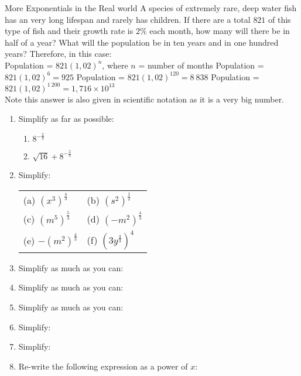 \begin{wex}{More Exponentials in the Real world} 
{A species of extremely rare, deep water fish has an very long lifespan and rarely has children. If there are a total $821$ of this type of fish and their growth rate is $2\%$ each month, how many will there be in half of a year? What will the population be in ten years and in one hundred years?}{
Therefore, in this case:\\
Population = $821(1,02)^n$,   where $n$ = number of months
Population = $821(1,02)^6 = 925$
Population = $821(1,02)^{120} = 8~838$
Population = $821(1,02)^{1~200} = 1,716 \times 10^{13}$\\
Note this answer is also given in scientific notation as it is a very big number.}
\end{wex}

\begin{eocexercises}{}
\begin{enumerate}
\item{Simplify as far as possible:
\begin{enumerate}
\item{$8^{-\frac{2}{3}}$}
\item{$\sqrt{16}+8^{-\frac{2}{3}}$}
\end{enumerate}}
\item{Simplify:
\begin{center}
\begin{tabular}{p{4cm}p{4cm}}
(a) $(x^3)^\frac{4}{3}$ & (b) $(s^2)^\frac{1}{2}$\\
(c) $(m^5)^\frac{5}{3}$& (d) $(-m^2)^\frac{4}{3}$\\
(e) $-(m^2)^\frac{4}{3}$&(f) $(3y^\frac{4}{3})^4$\\
\end{tabular}
\end{center}}

\item{Simplify as much as you can:
}

\item{Simplify as much as you can:
}

\item{Simplify as much as you can:
}
 \item{Simplify:
}

\item{Simplify:
}

\item{Re-write the following expression as a power of $x$:
}

\end{enumerate}



\practiceinfo
\end{eocexercises} 




